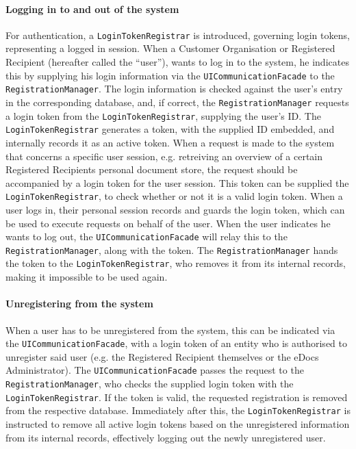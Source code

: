 \documentclass[a4paper,10pt]{article}
\begin{document}
\paragraph{Logging in to and out of the system}
For authentication, a \texttt{LoginTokenRegistrar} is introduced, governing login tokens, representing a logged in session. When a Customer Organisation or Registered Recipient (hereafter called the ``user''), wants to log in to the system, he indicates this by supplying his login information via the \texttt{UICommunicationFacade} to the \texttt{RegistrationManager}. The login information is checked against the user's entry in the corresponding database, and, if correct, the \texttt{RegistrationManager} requests a login token from the \texttt{LoginTokenRegistrar}, supplying the user's ID. The \texttt{LoginTokenRegistrar} generates a token, with the supplied ID embedded, and internally records it as an active token. When a request is made to the system that concerns a specific user session, e.g. retreiving an overview of a certain Registered Recipients personal document store, the request should be accompanied by a login token for the user session. This token can be supplied the \texttt{LoginTokenRegistrar}, to check whether or not it is a valid login token. When a user logs in, their personal session records and guards the login token, which can be used to execute requests on behalf of the user. When the user indicates he wants to log out, the \texttt{UICommunicationFacade} will relay this to the \texttt{RegistrationManager}, along with the token. The \texttt{RegistrationManager} hands the token to the \texttt{LoginTokenRegistrar}, who removes it from its internal records, making it impossible to be used again.

\paragraph{Unregistering from the system}
When a user has to be unregistered from the system, this can be indicated via the \texttt{UICommunicationFacade}, with a login token of an entity who is authorised to unregister said user (e.g. the Registered Recipient themselves or the eDocs Administrator). The \texttt{UICommunicationFacade} passes the request to the \texttt{RegistrationManager}, who checks the supplied login token with the \texttt{LoginTokenRegistrar}. If the token is valid, the requested registration is removed from the respective database. Immediately after this, the \texttt{LoginTokenRegistrar} is instructed to remove all active login tokens based on the unregistered information from its internal records, effectively logging out the newly unregistered user.
\end{document}
